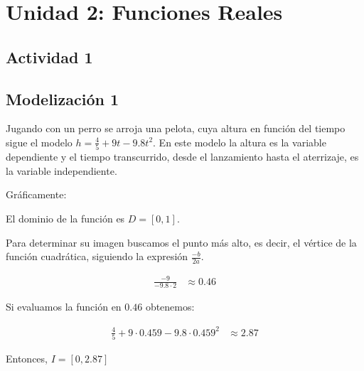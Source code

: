 \section*{Unidad 2: Funciones Reales}

\subsection*{Actividad 1}
\subsection*{Modelización 1}

Jugando con un perro se arroja una pelota, cuya altura en función del tiempo sigue el modelo $h = \frac{4}{5} + 9t - 9.8t^2$. En este modelo la altura es la variable dependiente y el tiempo transcurrido, desde el lanzamiento hasta el aterrizaje, es la variable independiente.

Gráficamente:

\begin{center}
\end{center}

El dominio de la función es $D = [0,1]$.

Para determinar su imagen buscamos el punto más alto, es decir, el vértice de la función cuadrática, siguiendo la expresión $\frac{-b}{2a}$.

\begin{align*}
    \frac{-9}{-9.8 \cdot 2} & \approx 0.46
\end{align*}

Si evaluamos la función en $0.46$ obtenemos:

\begin{align*}
    \frac{4}{5} + 9 \cdot 0.459 - 9.8 \cdot 0.459^2 & \approx 2.87
\end{align*}

Entonces, $I = [0, 2.87]$
